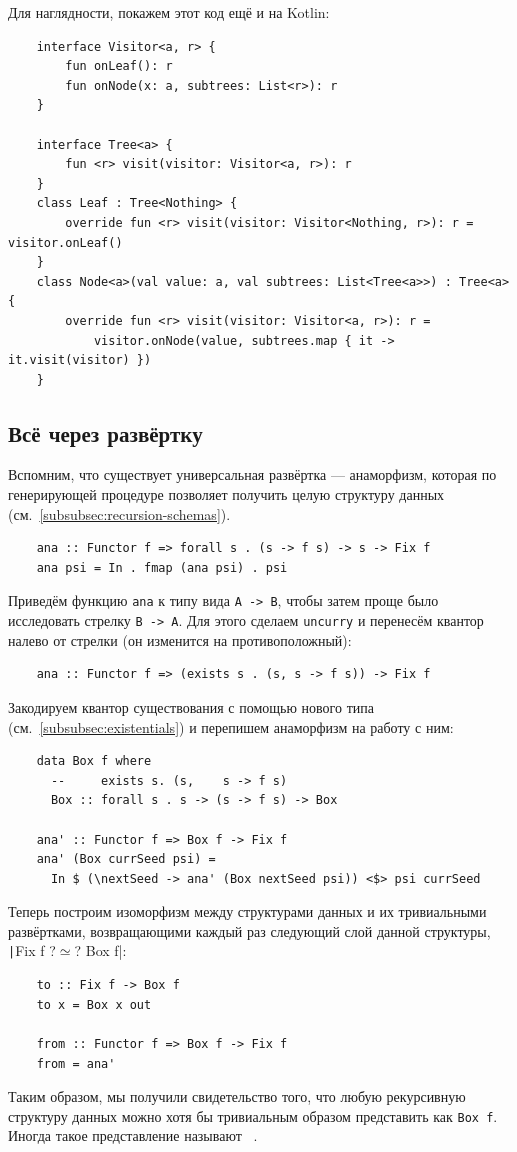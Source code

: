 Для наглядности, покажем этот код ещё и на Kotlin:
\begin{verbatim}
    interface Visitor<a, r> {
        fun onLeaf(): r
        fun onNode(x: a, subtrees: List<r>): r
    }

    interface Tree<a> {
        fun <r> visit(visitor: Visitor<a, r>): r
    }
    class Leaf : Tree<Nothing> {
        override fun <r> visit(visitor: Visitor<Nothing, r>): r = visitor.onLeaf()
    }
    class Node<a>(val value: a, val subtrees: List<Tree<a>>) : Tree<a> {
        override fun <r> visit(visitor: Visitor<a, r>): r =
            visitor.onNode(value, subtrees.map { it -> it.visit(visitor) })
    }
\end{verbatim}

\subsection{Всё через развёртку} \label{subsec:all-unfolds}

Вспомним, что существует универсальная развёртка --- анаморфизм, которая по генерирующей процедуре позволяет получить целую структуру данных (см.~\ref{subsubsec:recursion-schemas}).
\begin{verbatim}
    ana :: Functor f => forall s . (s -> f s) -> s -> Fix f
    ana psi = In . fmap (ana psi) . psi
\end{verbatim}

Приведём функцию \texttt{ana} к типу вида \texttt{A -> B}, чтобы затем проще было исследовать стрелку \texttt{B -> A}.
Для этого сделаем \texttt{uncurry} и перенесём квантор налево от стрелки (он изменится на противоположный):
\begin{verbatim}
    ana :: Functor f => (exists s . (s, s -> f s)) -> Fix f
\end{verbatim}
Закодируем квантор существования с помощью нового типа (см.~\ref{subsubsec:existentials}) и перепишем анаморфизм на работу с ним:
\begin{verbatim}
    data Box f where
      --     exists s. (s,    s -> f s)
      Box :: forall s . s -> (s -> f s) -> Box

    ana' :: Functor f => Box f -> Fix f
    ana' (Box currSeed psi) =
      In $ (\nextSeed -> ana' (Box nextSeed psi)) <$> psi currSeed
\end{verbatim}
Теперь построим изоморфизм между структурами данных и их тривиальными развёртками, возвращающими каждый раз следующий слой данной структуры, \texttt|Fix f ?$\simeq$? Box f|:
\begin{verbatim}
    to :: Fix f -> Box f
    to x = Box x out

    from :: Functor f => Box f -> Fix f
    from = ana'
\end{verbatim}
Таким образом, мы получили свидетельство того, что любую рекурсивную структуру данных можно хотя бы тривиальным образом представить как \texttt{Box f}.
Иногда такое представление называют ~\cite{gibbons2008unfolding}.

